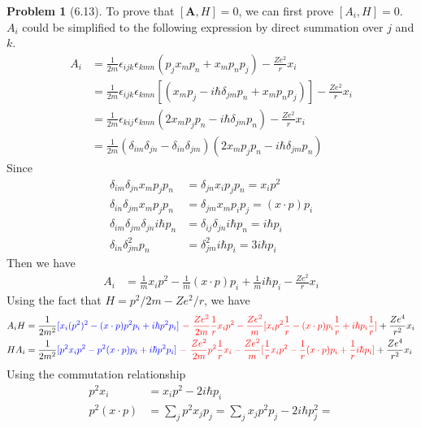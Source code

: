 \documentclass[twoside,11pt]{article}
\theoremstyle{definition}
\newtheorem{problem}{Problem}
\theoremstyle{remark}
\begin{document}
\begin{problem}[6.13]
To prove that $[\mathbf{A}, H]=0$, we can first prove $[A_i,H]=0$.
$A_i$ could be simplified to the following expression by direct summation
over $j$ and $k$.
\begin{align*}
    A_i &= \frac{1}{2m}\epsilon_{ijk}\epsilon_{kmn}
    (p_jx_mp_n+x_mp_np_j) - \frac{Ze^2}{r}x_i\\
    &= \frac{1}{2m}\epsilon_{ijk}\epsilon_{kmn}
    [(x_mp_j - i\hbar\delta_{jm}p_n + x_mp_np_j)] - \frac{Ze^2}{r}x_i\\
    &= \frac{1}{2m}\epsilon_{kij}\epsilon_{kmn}
    (2x_mp_jp_n - i\hbar\delta_{jm}p_n) - \frac{Ze^2}{r}x_i\\
    &= \frac{1}{2m}(\delta_{im}\delta_{jn} - \delta_{in}\delta_{jm})
    (2x_mp_jp_n - i\hbar\delta_{jm}p_n)
\end{align*}
Since
\begin{align*}
    \delta_{im}\delta_{jn}x_mp_jp_n &= \delta_{jn}x_ip_jp_n = x_ip^2\\
    \delta_{in}\delta_{jm}x_mp_jp_n &= \delta_{jm}x_mp_ip_j = (x\cdot p)p_i\\
    \delta_{im}\delta_{jm}\delta_{jn}i\hbar p_n&= 
    \delta_{ij}\delta_{jn}i\hbar p_n = i\hbar p_i\\
    \delta_{in}\delta_{jm}^2p_n &= \delta_{jm}^2 i\hbar p_i = 3i\hbar p_i
\end{align*}
Then we have 
\begin{align*}
    A_i &= \frac{1}{m}x_ip^2 - \frac{1}{m}(x\cdot p)p_i
    + \frac{1}{m}i\hbar p_i - \frac{Ze^2}{r}x_i
\end{align*}
Using the fact that $H=p^2/2m - Ze^2/r$, we have
\begin{align*}
    A_iH &=
    \frac{1}{2m^2}{\color{blue} [x_i(p^2)^2 - (x\cdot p) p^2p_i + i\hbar p^2p_i]
    }
    {\color{red}
    \ -\ \frac{Ze^2}{2m}\frac{1}{r}x_ip^2 - 
    \frac{Ze^2}{m}[x_ip^2\frac{1}{r} - (x\cdot p)p_i\frac{1}{r}
    +i\hbar p_i\frac{1}{r}]
    }
    + \frac{Ze^4}{r^2}x_i\\
    HA_i &= 
    \frac{1}{2m^2}{\color{blue}[p^2x_ip^2 - p^2(x\cdot p)p_i + i\hbar p^2p_i]
    }
    {\color{red} 
    \ -\ \frac{Ze^2}{2m}p^2\frac{1}{r}x_i 
     - \frac{Ze^2}{m}[\frac{1}{r}x_ip^2 - \frac{1}{r}(x\cdot p)p_i + 
    \frac{1}{r}i\hbar p_i]
    }
    + \frac{Ze^4}{r^2}x_i
\end{align*}
Using the commutation relationship
\begin{align*}
    p^2 x_i &= x_ip^2 - 2i\hbar p_i\\
    p^2(x\cdot p) &= \sum_j p^2x_jp_j 
    = \sum_j x_jp^2p_j - 2i\hbar p_j^2= 

\end{align*}
\end{problem}
\end{document}
